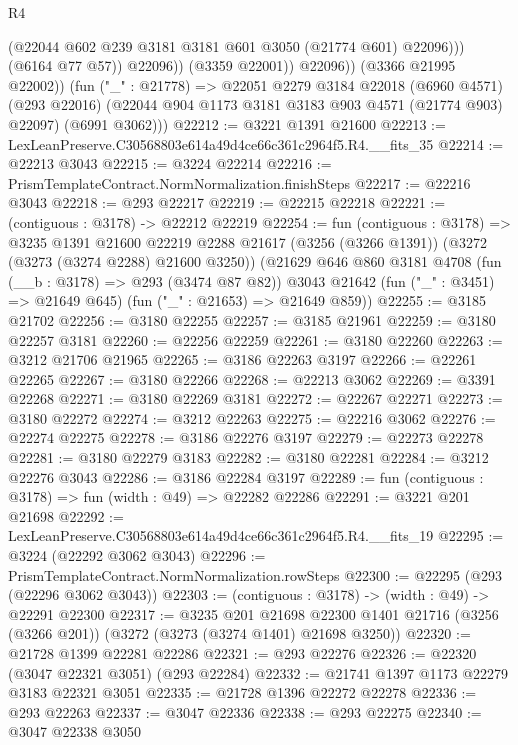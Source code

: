 \begin{lexlean}{R4}
\begin{coremodule}
                        (@22044 @602 @239 @3181 @3181 @601 @3050 (@21774 @601) @22096)))
                    (@6164 @77 @57))
                  @22096))
              (@3359 @22001))
            @22096))
        (@3366 @21995 @22002))
      (fun ("_" : @21778) =>
      @22051
        @2279
        @3184
        @22018
        (@6960 @4571)
        (@293 @22016)
        (@22044 @904 @1173 @3181 @3183 @903 @4571 (@21774 @903) @22097)
        (@6991 @3062)))
@22212 := @3221 @1391 @21600
@22213 := LexLeanPreserve.C30568803e614a49d4ce66c361c2964f5.R4.__fits_35
@22214 := @22213 @3043
@22215 := @3224 @22214
@22216 := PrismTemplateContract.NormNormalization.finishSteps
@22217 := @22216 @3043
@22218 := @293 @22217
@22219 := @22215 @22218
@22221 := (contiguous : @3178) -> @22212 @22219
@22254 := fun (contiguous : @3178) =>
  @3235
    @1391
    @21600
    @22219
    @2288
    @21617
    (@3256 (@3266 @1391))
    (@3272 (@3273 (@3274 @2288) @21600 @3250))
    (@21629
      @646
      @860
      @3181
      @4708
      (fun (__b : @3178) => @293 (@3474 @87 @82))
      @3043
      @21642
      (fun ("_" : @3451) => @21649 @645)
      (fun ("_" : @21653) => @21649 @859))
@22255 := @3185 @21702
@22256 := @3180 @22255
@22257 := @3185 @21961
@22259 := @3180 @22257 @3181
@22260 := @22256 @22259
@22261 := @3180 @22260
@22263 := @3212 @21706 @21965
@22265 := @3186 @22263 @3197
@22266 := @22261 @22265
@22267 := @3180 @22266
@22268 := @22213 @3062
@22269 := @3391 @22268
@22271 := @3180 @22269 @3181
@22272 := @22267 @22271
@22273 := @3180 @22272
@22274 := @3212 @22263
@22275 := @22216 @3062
@22276 := @22274 @22275
@22278 := @3186 @22276 @3197
@22279 := @22273 @22278
@22281 := @3180 @22279 @3183
@22282 := @3180 @22281
@22284 := @3212 @22276 @3043
@22286 := @3186 @22284 @3197
@22289 := fun (contiguous : @3178) => fun (width : @49) => @22282 @22286
@22291 := @3221 @201 @21698
@22292 := LexLeanPreserve.C30568803e614a49d4ce66c361c2964f5.R4.__fits_19
@22295 := @3224 (@22292 @3062 @3043)
@22296 := PrismTemplateContract.NormNormalization.rowSteps
@22300 := @22295 (@293 (@22296 @3062 @3043))
@22303 := (contiguous : @3178) -> (width : @49) -> @22291 @22300
@22317 := @3235
    @201
    @21698
    @22300
    @1401
    @21716
    (@3256 (@3266 @201))
    (@3272 (@3273 (@3274 @1401) @21698 @3250))
@22320 := @21728 @1399 @22281 @22286
@22321 := @293 @22276
@22326 := @22320 (@3047 @22321 @3051) (@293 @22284)
@22332 := @21741 @1397 @1173 @22279 @3183 @22321 @3051
@22335 := @21728 @1396 @22272 @22278
@22336 := @293 @22263
@22337 := @3047 @22336
@22338 := @293 @22275
@22340 := @3047 @22338 @3050

\end{coremodule}
\end{lexlean}
